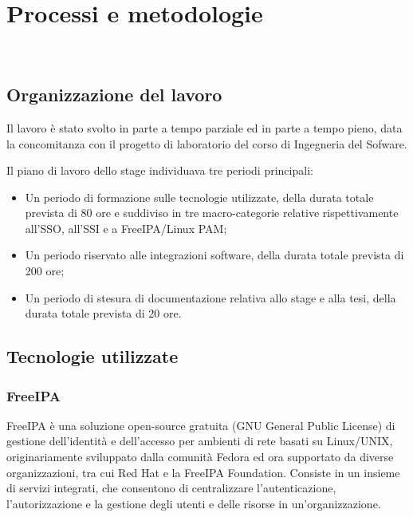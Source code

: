 
\chapter{Processi e metodologie}
\label{cap:processi-metodologie}

\\

\section{Organizzazione del lavoro}

Il lavoro è stato svolto in parte a tempo parziale ed in parte a tempo pieno, data la concomitanza con il progetto di laboratorio del corso di Ingegneria del Sofware. 

Il piano di lavoro dello stage individuava tre periodi principali:

\begin{itemize}
    \item Un periodo di formazione sulle tecnologie utilizzate, della durata totale prevista di 80 ore e suddiviso in tre macro-categorie relative rispettivamente all'SSO, all'SSI e a FreeIPA/Linux PAM;
    \item Un periodo riservato alle integrazioni software, della durata totale prevista di 200 ore;
    \item Un periodo di stesura di documentazione relativa allo stage e alla tesi, della durata totale prevista di 20 ore.
\end{itemize}




\section{Tecnologie utilizzate}
\subsection{FreeIPA}
FreeIPA è una soluzione open-source gratuita (GNU General Public License) di gestione dell'identità e dell'accesso per ambienti di rete basati su Linux/UNIX, originariamente sviluppato dalla comunità Fedora ed ora supportato da diverse organizzazioni, tra cui Red Hat e la FreeIPA Foundation. Consiste in un insieme di servizi integrati, che consentono di centralizzare l'autenticazione, l'autorizzazione e la gestione degli utenti e delle risorse in un'organizzazione.

